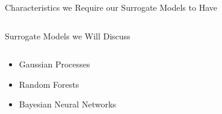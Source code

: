 \begin{frame}[c]{Characteristics we Require our Surrogate Models to Have}
\begin{columns}[T]
\begin{column}{.48\textwidth}
\end{column}%
\end{columns}

\end{frame}

\begin{frame}[c]{Surrogate Models we Will Discuss}

\begin{columns}[T] %
\begin{column}{.48\textwidth}
\begin{itemize}
	\item<1-3> Gaussian Processes 
	\item<2-3> Random Forests 
	\item<3-3> Bayesian Neural Networks 
\end{itemize}
\end{column}%

\hfill%


\end{columns}
\end{frame}
